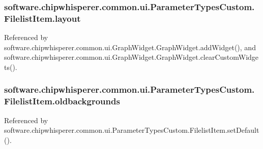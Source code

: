\subsubsection[{layout}]{\setlength{\rightskip}{0pt plus 5cm}software.\+chipwhisperer.\+common.\+ui.\+Parameter\+Types\+Custom.\+Filelist\+Item.\+layout}\label{classsoftware_1_1chipwhisperer_1_1common_1_1ui_1_1ParameterTypesCustom_1_1FilelistItem_a1e595b0ba895184c302a17bf903b68d1}


Referenced by software.\+chipwhisperer.\+common.\+ui.\+Graph\+Widget.\+Graph\+Widget.\+add\+Widget(), and software.\+chipwhisperer.\+common.\+ui.\+Graph\+Widget.\+Graph\+Widget.\+clear\+Custom\+Widgets().

\hypertarget{classsoftware_1_1chipwhisperer_1_1common_1_1ui_1_1ParameterTypesCustom_1_1FilelistItem_ac906d242ed39ba1cd71cb1f4678bbf7e}{}
\subsubsection[{oldbackgrounds}]{\setlength{\rightskip}{0pt plus 5cm}software.\+chipwhisperer.\+common.\+ui.\+Parameter\+Types\+Custom.\+Filelist\+Item.\+oldbackgrounds}\label{classsoftware_1_1chipwhisperer_1_1common_1_1ui_1_1ParameterTypesCustom_1_1FilelistItem_ac906d242ed39ba1cd71cb1f4678bbf7e}


Referenced by software.\+chipwhisperer.\+common.\+ui.\+Parameter\+Types\+Custom.\+Filelist\+Item.\+set\+Default().

\hypertarget{classsoftware_1_1chipwhisperer_1_1common_1_1ui_1_1ParameterTypesCustom_1_1FilelistItem_ab079e63094f9ed2051d1b92145c11827}{}
